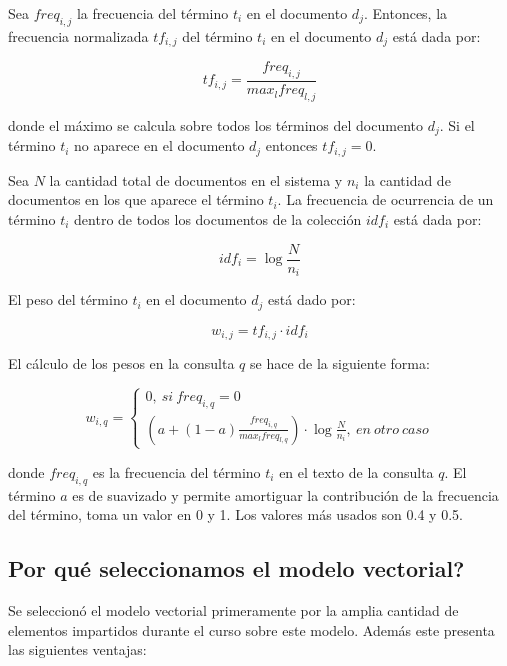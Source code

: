 \documentclass[runningheads]{llncs}
\begin{document}
	Sea $freq_{i,j}$ la frecuencia del t\'ermino $t_i$ en el documento $d_j$. Entonces, la frecuencia normalizada $tf_{i,j}$ del t\'ermino $t_i$ en el documento $d_j$ est\'a dada por:
	
	\begin{equation}
		tf_{i,j}=\frac{freq_{i,j}}{max_lfreq_{l,j}}
	\end{equation}

	donde el m\'aximo se calcula sobre todos los t\'erminos del documento $d_j$. Si el t\'ermino $t_i$ no aparece en el documento $d_j$ entonces $tf_{i,j}=0$.
	
	Sea $N$ la cantidad total de documentos en el sistema y $n_i$ la cantidad de documentos en los que aparece el t\'ermino $t_i$. La frecuencia de ocurrencia de un t\'ermino $t_i$ dentro de todos los documentos de la colecci\'on $idf_i$ est\'a dada por:
	
	\begin{equation}
		idf_i=\log \frac{N}{n_i}
	\end{equation}

	El peso del t\'ermino $t_i$ en el documento $d_j$ est\'a dado por:
	
	\begin{equation}
		w_{i,j}=tf_{i,j}\cdot idf_i
	\end{equation}

	El c\'alculo de los pesos en la consulta $q$ se hace de la siguiente forma:
	
	\begin{equation}
		w_{i,q}=\left\{\begin{array}{c}
			0,~si~freq_{i,q}=0\\
			\left(a+(1-a)\frac{freq_{i,q}}{max_lfreq_{l,q}}\right)\cdot\log \frac{N}{n_i},~en~otro~caso
		\end{array}\right. 
	\end{equation}

	donde $freq_{i,q}$ es la frecuencia del t\'ermino $t_i$ en el texto de la consulta $q$. El t\'ermino $a$ es de suavizado y permite amortiguar la contribuci\'on de la frecuencia del t\'ermino, toma un valor en 0 y 1. Los valores m\'as usados son 0.4 y 0.5. 
	
	\subsection{\textquestiondown Por qu\'e seleccionamos el modelo vectorial?}
	
	Se seleccion\'o el modelo vectorial primeramente por la amplia cantidad de elementos impartidos durante el curso sobre este modelo. Adem\'as este presenta las siguientes ventajas:
	
\end{document}

